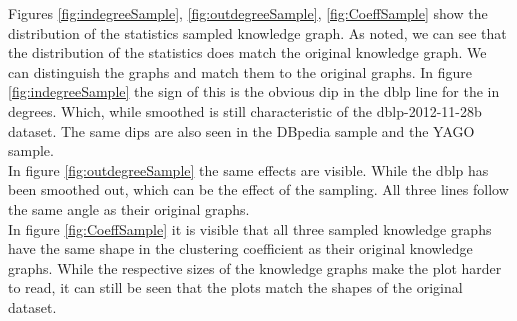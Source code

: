 \documentclass[11pt,letterpaper ,oneside ]{book}
\begin{document}
\begin{figure}[!b]
	\centering
	
\end{figure}
	Figures \ref{fig:indegreeSample},  \ref{fig:outdegreeSample},  \ref{fig:CoeffSample} show the distribution of the statistics sampled knowledge graph. As noted, we can see that the distribution of the statistics does match the original knowledge graph. We can distinguish the graphs and match them to the original graphs. 
	In figure \ref{fig:indegreeSample} the sign of this is the obvious dip in the dblp line for the in degrees. Which, while smoothed is still characteristic of the dblp-2012-11-28b dataset. The same dips are also seen in the DBpedia sample and the YAGO sample.\\
	In figure \ref{fig:outdegreeSample} the same effects are visible. While the dblp has been smoothed out, which can be the effect of the sampling. All three lines follow the same angle as their original graphs.\\
	In figure \ref{fig:CoeffSample} it is visible that all three sampled knowledge graphs have the same shape in the clustering coefficient as their original knowledge graphs. While the respective sizes of the knowledge graphs make the plot harder to read, it can still be seen that the plots match the shapes of the original dataset.
	
\end{document}
